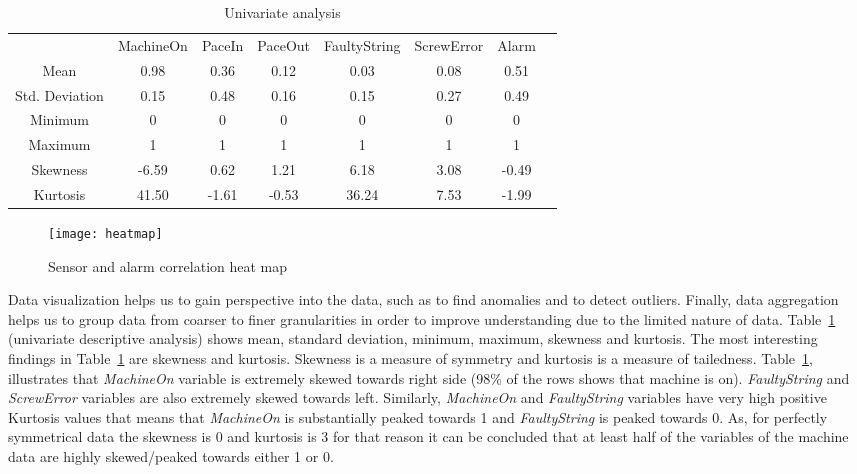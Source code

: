 \documentclass[runningheads]{llncs}
\begin{document}
\begin{table}[ht]
\caption{Univariate analysis}
\label{example3}
\centering
\begin{tabular}{cccccccc}
\hline\noalign{\smallskip}
 & MachineOn & PaceIn & PaceOut & FaultyString &  ScrewError & Alarm\\
\noalign{\smallskip}
\hline
\noalign{\smallskip}
Mean & 0.98 & 0.36 & 0.12 & 0.03 & 0.08 & 0.51\\
Std. Deviation & 0.15 & 0.48 & 0.16 & 0.15 & 0.27 & 0.49\\
Minimum & 0 & 0 & 0 & 0 & 0 & 0 \\
Maximum & 1 & 1 & 1 & 1 & 1 & 1\\
Skewness & -6.59  & 0.62 & 1.21  & 6.18   & 3.08 & -0.49\\
Kurtosis & 41.50  & -1.61 & -0.53  & 36.24  & 7.53 & -1.99\\
\hline
\end{tabular}
\end{table}

 \begin{figure}
\centering
    \texttt{[image: heatmap]}
  \caption{Sensor and alarm correlation heat map}
  \label{fig:correlation1}
\end{figure}

Data visualization helps us to gain perspective into the data, such as to find anomalies and to detect outliers. Finally, data aggregation helps us to group data from coarser to finer granularities in order to improve understanding due to the limited nature of data. Table~\ref{example3} (univariate descriptive analysis) shows mean, standard deviation, minimum, maximum, skewness and kurtosis. The most interesting findings in Table~\ref{example3} are skewness and kurtosis. Skewness is a measure of symmetry and kurtosis is a measure of  tailedness. Table~\ref{example3}, illustrates that \emph{MachineOn} variable is extremely skewed towards right side (98\% of the rows shows that machine is on). \emph{FaultyString} and \emph{ScrewError} variables are also extremely skewed towards left. Similarly, \emph{MachineOn} and \emph{FaultyString} variables have very high positive Kurtosis values that means that \emph{MachineOn} is substantially peaked towards 1 and \emph{FaultyString} is peaked towards 0. As, for perfectly symmetrical data the skewness is 0 and kurtosis is 3 for that reason it can be concluded that at least half of the variables of the machine data  are highly skewed/peaked towards either 1 or 0.
\end{document}
